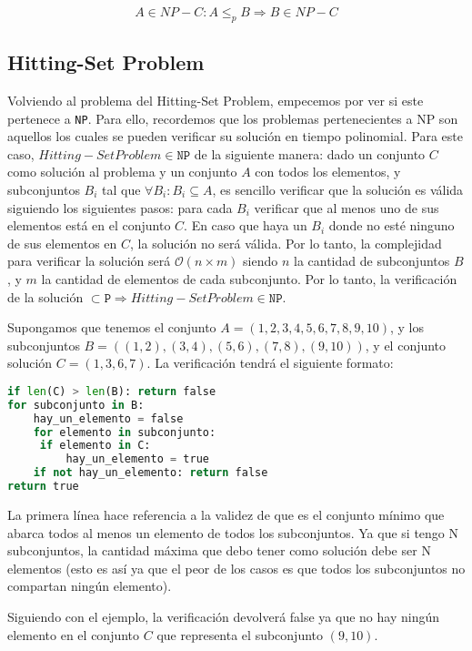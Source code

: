 \[ A \in {NP-C}: A \leq _p B \Rightarrow B \in NP-C \]

\subsection{Hitting-Set Problem}

Volviendo al problema del Hitting-Set Problem, empecemos por ver si este pertenece a \texttt{NP}. Para ello, recordemos que los problemas pertenecientes a NP son aquellos los cuales se pueden verificar su solución en tiempo polinomial. Para este caso, $Hitting-Set Problem \in \texttt{NP}$ de la siguiente manera: dado un conjunto $C$ como solución al problema y un conjunto $A$ con todos los elementos, y subconjuntos $B_i$ tal que $\forall B_i: B_i \subseteq A$, es sencillo verificar que la solución es válida siguiendo los siguientes pasos: para cada $B_i$ verificar que al menos uno de sus elementos está en el conjunto $C$. En caso que haya un $B_i$ donde no esté ninguno de sus elementos en $C$, la solución no será válida. Por lo tanto, la complejidad para verificar la solución será $\mathcal{O}(n \times m)$ siendo $n$ la cantidad de subconjuntos $B$, y $m$ la cantidad de elementos de cada subconjunto. Por lo tanto, la verificación de la solución $\subset \texttt{P} \Rightarrow Hitting-Set Problem \in \texttt{NP}$.

Supongamos que tenemos el conjunto $A = (1, 2, 3, 4, 5, 6, 7, 8, 9, 10)$, y los subconjuntos $B = ((1, 2), (3, 4), (5, 6), (7, 8), (9, 10))$, y el conjunto solución $C = (1, 3, 6, 7)$. La verificación tendrá el siguiente formato:

\begin{lstlisting}[language=Python]
if len(C) > len(B): return false
for subconjunto in B:
    hay_un_elemento = false
    for elemento in subconjunto:
   	 if elemento in C:
   		 hay_un_elemento = true
    if not hay_un_elemento: return false
return true
\end{lstlisting}

La primera línea hace referencia a la validez de que es el conjunto mínimo que abarca todos al menos un elemento de todos los subconjuntos. Ya que si tengo N subconjuntos, la cantidad máxima que debo tener como solución debe ser N elementos (esto es así ya que el peor de los casos es que todos los subconjuntos no compartan ningún elemento).

Siguiendo con el ejemplo, la verificación devolverá false ya que no hay ningún elemento en el conjunto $C$ que representa el subconjunto $(9, 10)$.


